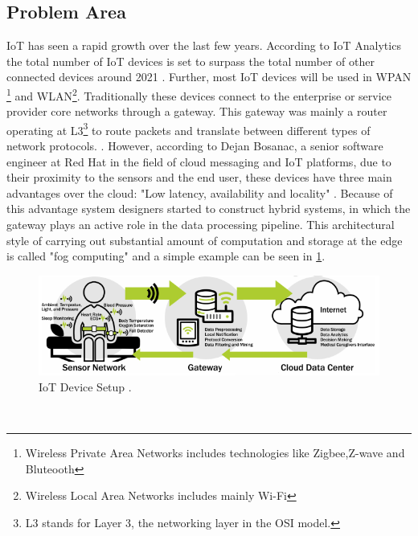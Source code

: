 \subsection{Problem Area}
IoT has seen a rapid growth over the last few years. According to IoT Analytics the total number of IoT devices is set to surpass the total number of other connected devices around 2021 \cite{StateofIoT:online}. Further, most IoT devices will be used in WPAN \footnote{Wireless Private Area Networks includes technologies like Zigbee,Z-wave and Bluteooth} and WLAN\footnote{Wireless Local Area Networks includes mainly Wi-Fi}. 
Traditionally these devices connect to the enterprise or service provider core networks through a gateway. This gateway was mainly a router operating at L3\footnote{L3 stands for Layer 3, the networking layer in the OSI model.} to route packets and translate between different types of network protocols. \cite{lee2017futureOfIoT}. However, according to Dejan Bosanac, a senior software engineer at Red Hat in the field of cloud messaging and IoT platforms, due to their proximity to the sensors and the end user, these devices have three main advantages over the cloud: "Low latency, availability and locality"
 \cite{Introducing:kubeedge}.
 Because of this advantage system designers started to construct hybrid systems, in which the gateway plays an active role in the data processing pipeline. This architectural style of carrying out substantial amount of computation and storage at the edge is called "fog computing" \cite{fogComputing:def} and a simple example can be seen in \cref{fig:iotDeviceSetup}. 
 \begin{figure}[h!]
     \centering
     \includegraphics[scale=1.8]{figures/iotSetup.png}
     \caption{IoT Device Setup \cite{iotGatewaySlavesGraph}.}
     \label{fig:iotDeviceSetup}
 \end{figure}\\

